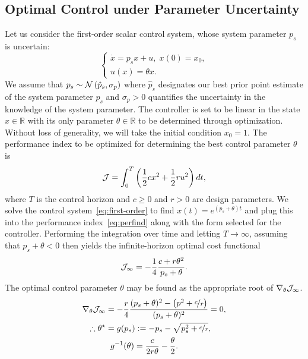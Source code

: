 \subsection{Optimal Control under Parameter Uncertainty}
%
Let us consider the first-order scalar control system, whose system parameter
$p_s$ is uncertain: 
%
\begin{equation} \begin{cases} \dot{x} = p_sx + u, \; x(0) =
  x_0, \\ u(x) = \theta x.  \end{cases} \label{eq:first-order} \end{equation}
%
We assume that $p_s \sim \mathcal{N}\left(\hat{p}_s, \sigma_{p}\right)$ where
$\hat{p}_s$ designates our best prior point estimate of the system parameter $p_s$
and $\sigma_{p} > 0$ quantifies the uncertainty in the knowledge of the system
parameter. The controller is set to be linear in the state $x \in \mathbb{R}$
with its only parameter $\theta \in \mathbb{R}$ to be determined through
optimization. Without loss of generality, we will take the initial condition
$x_0 = 1$. The performance index to be optimized for determining the best
control parameter $\theta$ is
%
\begin{equation} \mathcal{J} = \int_0^T \left(\frac{1}{2}cx^2 + \frac{1}{2}ru^2 \right) dt,
\label{eq:perfind} \end{equation}
%
where $T$ is the control horizon and $c \geq 0$ and $r > 0$ are design
parameters. We solve the control system~\eqref{eq:first-order} to find $x(t) =
e^{(p_s+\theta)t}$ and plug this into the performance index~\eqref{eq:perfind}
along with the form selected for the controller. Performing the integration over
time and letting $T \to \infty$, assuming that $p_s+\theta < 0$ then yields the
infinite-horizon optimal cost functional
\begin{equation} \mathcal{J}_\infty = -\frac{1}{4}\frac{c+r\theta^2}{p_s+\theta}.
\label{eq:inf-time-integrated-cost} \end{equation}
%
The optimal control parameter $\theta$ may be found as the appropriate root of
$\nabla_\theta \mathcal{J}_\infty$. 
%
\begin{align} 
    \begin{split} 
        \nabla_\theta \mathcal{J}_\infty &= -\frac{r}{4}\frac{(p_s+\theta)^2 - \left(p^2
        + \nicefrac{c}{r}\right)}{(p_s+\theta)^2} = 0, \\ 
        \therefore \theta^\star &= g(p_s) :=-p_s - \sqrt{p_s^2 + \nicefrac{c}{r}}, \\
        &\hspace{2mm} g^{-1}(\theta) = \frac{c}{2r\theta} - \frac{\theta}{2}.
    \end{split} 
    \label{eq:optimal_theta} 
\end{align}
